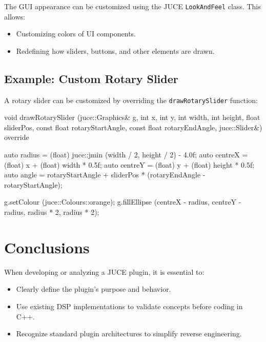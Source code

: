 The GUI appearance can be customized using the JUCE \texttt{LookAndFeel} class. This allows:

\begin{itemize}
    \item Customizing colors of UI components.
    \item Redefining how sliders, buttons, and other elements are drawn.
\end{itemize}

\subsection{Example: Custom Rotary Slider}

A rotary slider can be customized by overriding the \texttt{drawRotarySlider} function:

\begin{supercollider*}
void drawRotarySlider (juce::Graphics& g, int x, int y, int width, 
int height, float sliderPos, const float rotaryStartAngle, 
const float rotaryEndAngle, juce::Slider&) override
{
    auto radius = (float) juce::jmin (width / 2, height / 2) - 4.0f;
    auto centreX = (float) x + (float) width  * 0.5f;
    auto centreY = (float) y + (float) height * 0.5f;
    auto angle = rotaryStartAngle + sliderPos * (rotaryEndAngle - rotaryStartAngle);

    g.setColour (juce::Colours::orange);
    g.fillEllipse (centreX - radius, centreY - radius, radius * 2, radius * 2);
}
\end{supercollider*}

\section{Conclusions}

When developing or analyzing a JUCE plugin, it is essential to:

\begin{itemize}
    \item Clearly define the plugin’s purpose and behavior.
    \item Use existing DSP implementations to validate concepts before coding in C++.
    \item Recognize standard plugin architectures to simplify reverse engineering.
\end{itemize}
